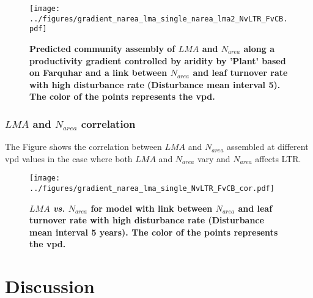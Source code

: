 \documentclass[a4paper,11pt]{article}
\begin{document}
\begin{figure}[H] 
\centering
\texttt{[image: ../figures/gradient\_narea\_lma\_single\_narea\_lma2\_NvLTR\_FvCB.pdf]}
\caption{\textbf{Predicted community assembly of $LMA$ and $N_{area}$
    along a productivity gradient controlled by aridity by 'Plant'
    based on Farquhar and a link between $N_{area}$ and leaf turnover rate
    with high disturbance rate (Disturbance mean interval 5). The color of the points represents the vpd.}
\label{fig:lma_nareaFh2_NvLTR}}
\end{figure}


\subsubsection{$LMA$ and $N_{area}$ correlation}

The Figure \label{fig:lma_narea_cor_single_NvLTR} shows the correlation
between $LMA$ and $N_{area}$  assembled at different
vpd values in the case where both $LMA$ and $N_{area}$ vary and $N_{area}$ affects
LTR.


\begin{figure}[H]
\centering
\texttt{[image: ../figures/gradient\_narea\_lma\_single\_NvLTR\_FvCB\_cor.pdf]}
\caption{\textbf{$LMA$ \textit{vs.} $N_{area}$ for model with link between $N_{area}$  and leaf turnover rate with high disturbance rate (Disturbance mean interval 5 years). The color of the points represents the vpd.}
\label{fig:lma_narea_cor_single_NvLTR}}
\end{figure}

\pagebreak[4]


\section{Discussion}
\end{document}
